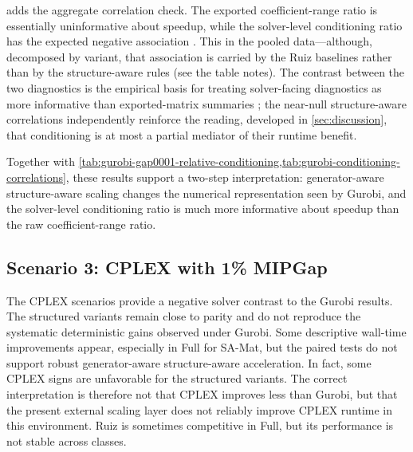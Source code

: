 \documentclass[AMA,Times1COL]{WileyNJDv5} %
\newcommand{\methodMat}{SA-Mat}
\providecommand{\DIFadd}[1]{{\protect\color{blue} \sf #1}} %
\providecommand{\DIFdel}[1]{{\protect\color{red} \scriptsize #1}} %
\providecommand{\DIFaddbegin}{} %
\providecommand{\DIFaddend}{} %
\providecommand{\DIFdelbegin}{} %
\providecommand{\DIFdelend}{} %
\begin{document}
\noindent {} adds the aggregate correlation check. The exported coefficient-range ratio is essentially uninformative about speedup, while the solver-level conditioning ratio has the expected negative association \DIFdelbegin \DIFdel{. This }\DIFdelend \DIFaddbegin \DIFadd{in the pooled data---although, decomposed by variant, that association is carried by the Ruiz baselines rather than by the structure-aware rules (see the table notes). The contrast between the two diagnostics }\DIFaddend is the empirical basis for treating solver-facing diagnostics as more informative than exported-matrix summaries\DIFaddbegin \DIFadd{; the near-null structure-aware correlations independently reinforce the reading, developed in \cref{sec:discussion}, that conditioning is at most a partial mediator of their runtime benefit}\DIFaddend .


Together with \cref{tab:gurobi-gap0001-relative-conditioning,tab:gurobi-conditioning-correlations},
these results support a two-step interpretation: \DIFdelbegin \DIFdel{generator-aware }\DIFdelend \DIFaddbegin \DIFadd{structure-aware }\DIFaddend scaling changes the
numerical representation seen by Gurobi, and the solver-level conditioning ratio is much
more informative about speedup than the raw coefficient-range ratio.

\FloatBarrier

\subsection{Scenario 3: CPLEX with 1\% MIPGap}

The CPLEX scenarios provide a negative solver contrast to the Gurobi results. The structured variants remain close to parity and do not reproduce the systematic deterministic gains observed under Gurobi. Some descriptive wall-time improvements appear, especially in Full for \methodMat{}, but the paired tests do not support robust \DIFdelbegin \DIFdel{generator-aware }\DIFdelend \DIFaddbegin \DIFadd{structure-aware }\DIFaddend acceleration. In fact, some CPLEX signs are unfavorable for the structured variants. The correct interpretation is therefore not that CPLEX improves less than Gurobi, but that the present external scaling layer does not reliably improve CPLEX runtime in this environment. Ruiz is sometimes competitive in Full, but its performance is not stable across classes.
\end{document}
